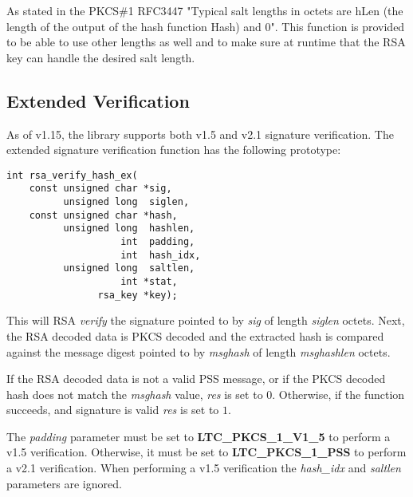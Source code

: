 \documentclass[synpaper]{book}
\begin{document}
As stated in the PKCS\#1 RFC3447 "Typical salt lengths in octets are hLen
(the length of the output of the hash function Hash) and 0".
This function is provided to be able to use other lengths as well and to make
sure at runtime that the RSA key can handle the desired salt length.

\subsection{Extended Verification}

As of v1.15, the library supports both v1.5 and v2.1 signature verification.  The extended signature verification function has the following prototype:

\begin{verbatim}
int rsa_verify_hash_ex(
    const unsigned char *sig,
          unsigned long  siglen,
    const unsigned char *hash,
          unsigned long  hashlen,
                    int  padding,
                    int  hash_idx,
          unsigned long  saltlen,
                    int *stat,
                rsa_key *key);
\end{verbatim}

This will RSA \textit{verify} the signature pointed to by \textit{sig} of length \textit{siglen} octets.  Next, the RSA decoded data is PKCS decoded
and the extracted hash is compared against the message digest pointed to by \textit{msghash} of length \textit{msghashlen} octets.

If the RSA decoded data is not a valid PSS message, or if the PKCS decoded hash does not match the \textit{msghash}
value, \textit{res} is set to $0$.  Otherwise, if the function succeeds, and signature is valid \textit{res} is set to $1$.

The \textit{padding} parameter must be set to \textbf{LTC\_PKCS\_1\_V1\_5} to perform a v1.5 verification.  Otherwise, it must be set to
\textbf{LTC\_PKCS\_1\_PSS} to perform a v2.1 verification.  When performing a v1.5 verification the \textit{hash\_idx} and \textit{saltlen} parameters are ignored.
\end{document}

